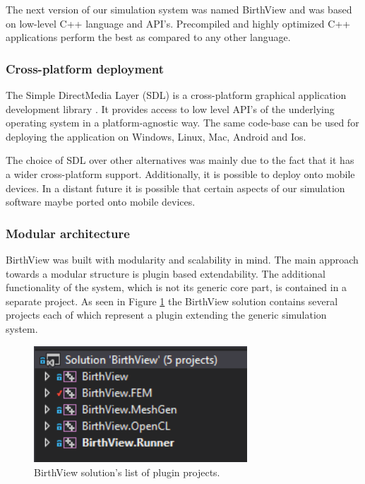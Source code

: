The next version of our simulation system was named BirthView and was based on low-level C++ language and API's. Precompiled and highly optimized C++ applications perform the best as compared to any other language.

\subsubsection{Cross-platform deployment}

The Simple DirectMedia Layer (SDL) is a cross-platform graphical application development library \cite{libsdl}. It provides access to low level API's of the underlying operating system in a platform-agnostic way. The same code-base can be used for deploying the application on Windows, Linux, Mac, Android and Ios.

The choice of SDL over other alternatives was mainly due to the fact that it has a wider cross-platform support. Additionally, it is possible to deploy onto mobile devices. In a distant future it is possible that certain aspects of our simulation software maybe ported onto mobile devices.

\subsubsection{Modular architecture}

BirthView was built with modularity and scalability in mind. The main approach towards a modular structure is plugin based extendability. The additional functionality of the system, which is not its generic core part, is contained in a separate project. As seen in Figure \ref{software-birthview-projects} the BirthView solution contains several projects each of which represent a plugin extending the generic simulation system.

\begin{figure}
\begin{center}
\includegraphics[width=80mm]{sections/methodology/images/software/birthview-projects.png}
\caption[BirthView solution's list of plugin projects.]{\label{software-birthview-projects} BirthView solution's list of plugin projects.}
\end{center}
\end{figure}

